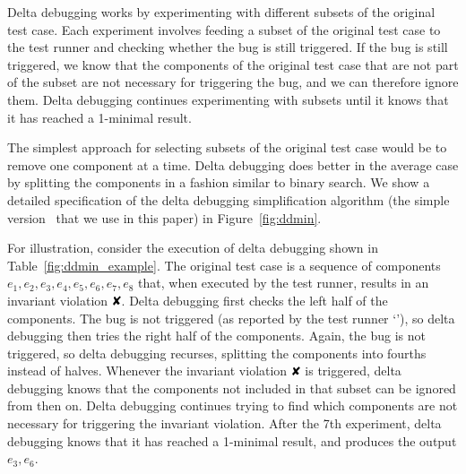 Delta debugging works by experimenting with different subsets of the original test
case. Each experiment involves feeding a subset of the original test case to the test runner
and checking whether the bug is still triggered. If the bug is still
triggered, we know that the components of the original test case that are not part of the
subset are not necessary for triggering the
bug, and we can therefore ignore them. Delta debugging continues experimenting
with subsets until it knows that it has reached a 1-minimal result.

The simplest approach for selecting subsets of the original test case would be
to remove one component at a time. Delta debugging does better in the average
case by splitting the components in a fashion similar to binary search. We
show a detailed specification of the delta debugging simplification algorithm
(the simple version~\cite{Zeller:1999:YMP:318773.318946} that we use in this paper) in Figure~\ref{fig:ddmin}.

For illustration, consider the
execution of delta debugging shown in Table~\ref{fig:ddmin_example}. The original
test case is a sequence of components $e_1,e_2,e_3,e_4,e_5,e_6,e_7,e_8$ that,
when executed by the test runner, results in an invariant violation $\DFAIL$. Delta
debugging first checks the left half of the components. The bug is not
triggered (as reported by the test runner `'),
so delta debugging then tries the right half of the components. Again, the
bug is not triggered, so delta debugging recurses, splitting the components
into fourths instead of halves. Whenever the invariant violation $\DFAIL$ is
triggered, delta debugging knows that the components not included in that
subset can be
ignored from then on. Delta debugging continues trying to find which
components are not necessary for triggering the invariant violation. After the 7th experiment, delta debugging
knows that it has reached a 1-minimal result, and produces the output
$e_3,e_6$.

